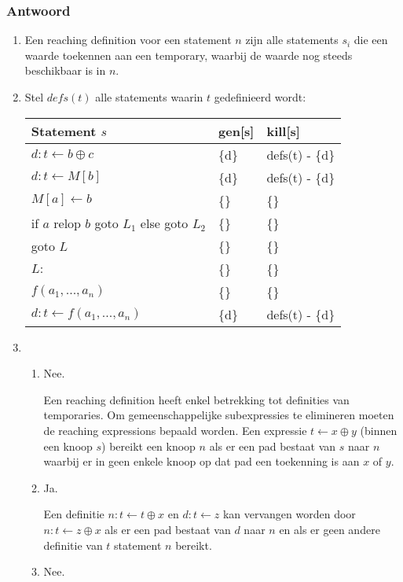 \documentclass{report}
\newcommand{\answer}[1]{
		\subsubsection*{Antwoord}
			#1
}
\begin{document}
	\answer{
		\begin{enumerate}
			\item Een reaching definition voor een statement $n$ zijn alle statements $s_i$ die een waarde toekennen aan een temporary, waarbij de waarde nog steeds beschikbaar is in $n$. 
			\item 		
			Stel $defs(t)$ alle statements waarin $t$ gedefinieerd wordt:
			\begin{table}[ht]
				\centering
				\begin{tabular}{l l l}
					Statement $s$ & gen[s] & kill[s] \\
					\hline
					$d : t \leftarrow b \oplus c$ & \{d\} & defs(t) - \{d\} \\
					$d : t \leftarrow M[b]$  & \{d\} & defs(t) - \{d\} \\
					$M[a] \leftarrow b$ & \{\} & \{\} \\
					if $a$ relop $b$ goto $L_1$ else goto $L_2$  & \{\} & \{\} \\
					goto $L$  & \{\} & \{\} \\
					$L :$  & \{\} & \{\} \\
					$f(a_1, ... , a_n)$  & \{\} & \{\} \\
					$d : t \leftarrow f(a_1, ..., a_n)$  & \{d\} & defs(t) - \{d\} \\
				\end{tabular}
			\end{table}
			\item 
			\begin{enumerate}
				\item Nee. 

				Een reaching definition heeft enkel betrekking tot definities van temporaries. Om gemeenschappelijke subexpressies te elimineren moeten de reaching expressions bepaald worden. Een expressie $t \leftarrow x \oplus y$ (binnen een knoop $s$) bereikt een knoop $n$ als er een pad bestaat van $s$ naar $n$ waarbij er in geen enkele knoop op dat pad een  toekenning is aan $x$ of $y$.

				\item Ja.

				Een definitie $n : t \leftarrow t \oplus x$ en $d : t \leftarrow z$  kan vervangen worden door $n : t \leftarrow z \oplus x$ als er een pad bestaat van $d$ naar $n$ en als er geen andere definitie van $t$ statement $n$ bereikt. 
				
				\item Nee.


\end{enumerate}
\end{enumerate}}
\end{document}

